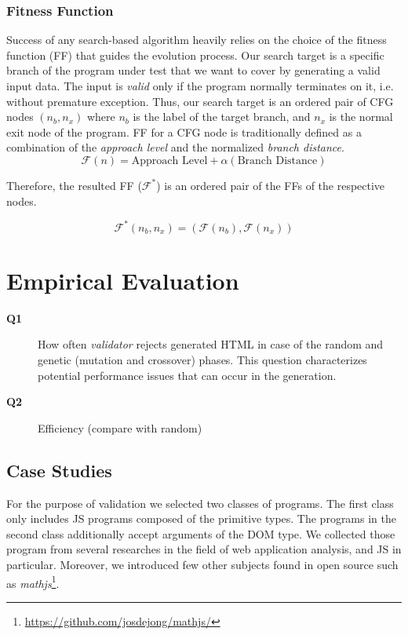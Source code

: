 \documentclass[sigconf]{acmart}
\begin{document}
\subsubsection{Fitness Function}
\label{sub.sub.sec.fitness.fun}

Success of any search-based algorithm heavily relies on the choice of the fitness function (FF) that guides the evolution process. Our search target is a specific branch of the program under test that we want to cover by generating a valid input data. The input is \emph{valid} only if the program normally terminates on it, i.e. without premature exception. Thus, our search target is an ordered pair of CFG nodes $(n_b, n_x)$ where $n_b$ is the label of the target branch, and $n_x$ is the normal exit node of the program. FF for a CFG node is traditionally defined as a combination of the \emph{approach level} and the normalized \emph{branch distance}\cite{arcuri2010does}. 
\[
\mathcal{F}(n) = \text{Approach Level} + \alpha({\text{Branch Distance}})
\]

Therefore, the resulted FF ($\mathcal{F}^*$) is an ordered pair of the FFs of the respective nodes.   

\[
\mathcal{F}^*(n_b, n_x) = (\mathcal{F}(n_b), \mathcal{F}(n_x))
\]

\section{Empirical Evaluation}
\label{sec.evaluation}

\begin{description}
\item[\textbf{Q1}] How often \emph{validator} rejects generated HTML in case of the random and genetic (mutation and crossover) phases. This question characterizes potential performance issues that can occur in the generation.
\item[\textbf{Q2}] Efficiency (compare with random)  
\end{description}

\subsection{Case Studies}
\label{sub.sec.case.studies}

For the purpose of validation we selected two classes of programs. The first class only includes JS programs composed of the primitive types. The programs in the second class additionally accept arguments of the DOM type. We collected those program from several researches in the field of web application analysis, and JS in particular. Moreover, we introduced few other subjects found in open source such as \emph{mathjs}\footnote{\url{https://github.com/josdejong/mathjs/}}.
\end{document}
